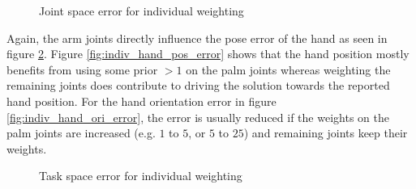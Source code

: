 \begin{figure}
\centering
{}
%

\caption{Joint space error for individual weighting}
\label{fig:indiv_joint_error}
\end{figure}

Again, the arm joints directly influence the pose error of the hand as seen in figure \ref{fig:indiv_pose_error}. Figure \ref{fig:indiv_hand_pos_error} shows that the hand position mostly benefits from using some prior $>1$ on the palm joints whereas weighting the remaining joints does contribute to driving the solution towards the reported hand position. For the hand orientation error in figure \ref{fig:indiv_hand_ori_error}, the error is usually reduced if the weights on the palm joints are increased (e.g. $1$ to $5$, or $5$ to $25$) and remaining joints keep their weights.

\begin{figure}
\centering
{}
%

\caption{Task space error for individual weighting}
\label{fig:indiv_pose_error}
\end{figure}

